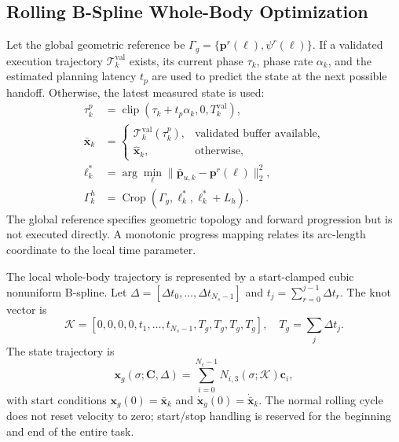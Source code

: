 \documentclass[journal,twoside]{IEEEtran}
\begin{document}
\subsection{Rolling B-Spline Whole-Body Optimization}
Let the global geometric reference be $\Gamma_g=\{\mathbf p^r(\ell),\psi^r(\ell)\}$. If a validated execution trajectory $\mathcal T_k^{\mathrm{val}}$ exists, its current phase $\tau_k$, phase rate $\alpha_k$, and the estimated planning latency $t_p$ are used to predict the state at the next possible handoff. Otherwise, the latest measured state is used:
\begin{equation}
\begin{aligned}
\tau_k^p&=\operatorname{clip}(\tau_k+t_p\alpha_k,0,T_k^{\mathrm{val}}),\\
\bar{\mathbf x}_k&=
\begin{cases}
\mathcal T_k^{\mathrm{val}}(\tau_k^p),&\text{validated buffer available},\\
\hat{\mathbf x}_k,&\text{otherwise},
\end{cases}\\
\ell_k^*&=\arg\min_\ell\|\bar{\mathbf p}_{u,k}-\mathbf p^r(\ell)\|_2^2,\\
\Gamma_k^h&=\operatorname{Crop}(\Gamma_g,\ell_k^*,\ell_k^*+L_h).
\end{aligned}
\label{eq:rolling_crop}
\end{equation}
The global reference specifies geometric topology and forward progression but is not executed directly. A monotonic progress mapping relates its arc-length coordinate to the local time parameter.

The local whole-body trajectory is represented by a start-clamped cubic nonuniform B-spline. Let $\Delta=[\Delta t_0,\ldots,\Delta t_{N_s-1}]$ and $t_j=\sum_{r=0}^{j-1}\Delta t_r$. The knot vector is
\begin{equation}
\mathcal K=[0,0,0,0,t_1,\ldots,t_{N_s-1},T_g,T_g,T_g,T_g],
\quad T_g=\sum_j\Delta t_j.
\label{eq:knot_vector}
\end{equation}
The state trajectory is
\begin{equation}
\mathbf x_g(\sigma;\mathbf C,\Delta)=
\sum_{i=0}^{N_c-1}N_{i,3}(\sigma;\mathcal K)\mathbf c_i,
\label{eq:bspline_traj}
\end{equation}
with start conditions $\mathbf x_g(0)=\bar{\mathbf x}_k$ and $\dot{\mathbf x}_g(0)=\dot{\bar{\mathbf x}}_k$. The normal rolling cycle does not reset velocity to zero; start/stop handling is reserved for the beginning and end of the entire task.
\end{document}
